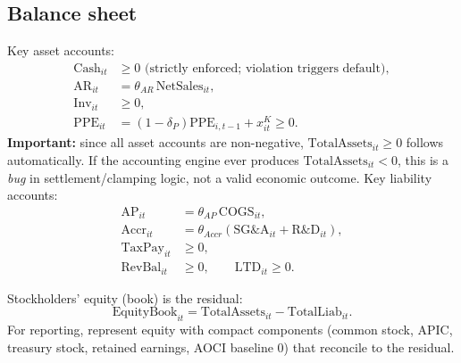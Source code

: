 \documentclass[11pt]{article}
\begin{document}
\subsection{Balance sheet}
Key asset accounts:
\begin{align}
\text{Cash}_{it} &\ge 0 \text{ (strictly enforced; violation triggers default)},\\
\text{AR}_{it}&=\theta_{AR}\,\text{NetSales}_{it},\\
\text{Inv}_{it}&\ge 0,\\
\text{PPE}_{it}&=(1-\delta_P)\text{PPE}_{i,t-1}+x^K_{it} \ge 0.
\end{align}
\textbf{Important:} since all asset accounts are non-negative, $\text{TotalAssets}_{it}\ge 0$ follows automatically. If the accounting engine ever produces $\text{TotalAssets}_{it}<0$, this is a \emph{bug} in settlement/clamping logic, not a valid economic outcome.
Key liability accounts:
\begin{align}
\text{AP}_{it}&=\theta_{AP}\,\text{COGS}_{it},\\
\text{Accr}_{it}&=\theta_{Accr}(\text{SG\&A}_{it}+\text{R\&D}_{it}),\\
\text{TaxPay}_{it}&\ge 0,\\
\text{RevBal}_{it}&\ge 0,\qquad \text{LTD}_{it}\ge 0.
\end{align}

Stockholders' equity (book) is the residual:
\[
\text{EquityBook}_{it}=\text{TotalAssets}_{it}-\text{TotalLiab}_{it}.
\]
For reporting, represent equity with compact components (common stock, APIC, treasury stock, retained earnings, AOCI baseline 0) that reconcile to the residual.
\end{document}
